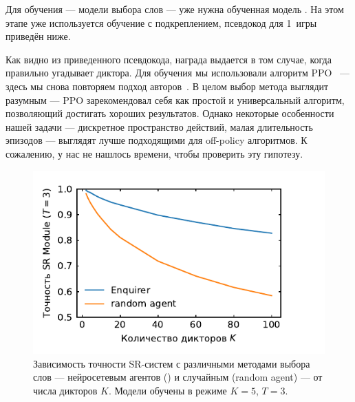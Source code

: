 Для обучения \enquirer{} --- модели выбора слов --- уже нужна обученная модель
\guesser{}. На этом этапе уже используется обучение с подкреплением, псевдокод
для 1~игры приведён ниже.


Как видно из приведенного псевдокода, награда выдается в том случае, когда
\guesser{} правильно угадывает диктора. Для обучения мы использовали алгоритм
PPO~\cite{schulman2017proximal} --- здесь мы снова повторяем подход
авторов~\citeisr{}. В целом выбор метода выглядит разумным --- PPO
зарекомендовал себя как простой и универсальный алгоритм, позволяющий достигать
хороших результатов. Однако некоторые особенности нашей задачи --- дискретное
пространство действий, малая длительность эпизодов --- выглядят лучше подходящими
для off-policy алгоритмов. К сожалению, у нас не нашлось времени, чтобы проверить
эту гипотезу.

\begin{figure}[htb]
    \centering
    \includegraphics[scale=1.0]{../plots/guest_sweep_enq.pdf}
    \caption{Зависимость точности SR-систем с различными методами выбора слов
    --- нейросетевым агентов (\enquirer{}) и случайным (random agent) --- от
    числа дикторов $K$. Модели обучены в режиме $K = 5$, $T = 3$.}
\end{figure}

